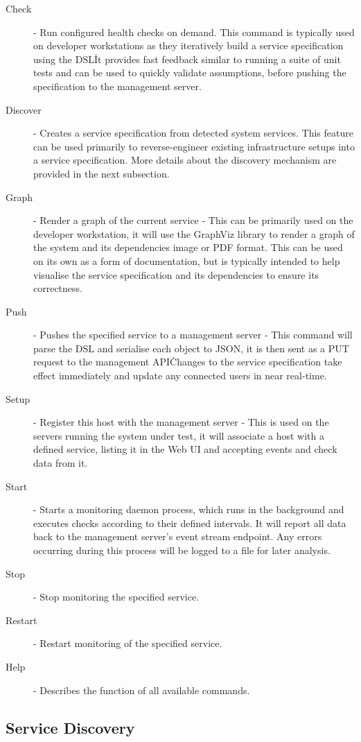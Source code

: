 \documentclass{cshonours}
\begin{document}
\begin{description}
  \item[Check] - Run configured health checks on demand. This command is typically used on developer workstations as they iteratively build a service specification using the DSL\. It provides fast feedback similar to running a suite of unit tests and can be used to quickly validate assumptions, before pushing the specification to the management server.
  \item[Discover] - Creates a service specification from detected system services. This feature can be used primarily to reverse-engineer existing infrastructure setups into a service specification. More details about the discovery mechanism are provided in the next subsection.
  \item[Graph] - Render a graph of the current service - This can be primarily used on the developer workstation, it will use the GraphViz library to render a graph of the system and its dependencies image or PDF format. This can be used on its own as a form of documentation, but is typically intended to help visualise the service specification and its dependencies to ensure its correctness.
  \item[Push] - Pushes the specified service to a management server - This command will parse the DSL and serialise each object to JSON, it is then sent as a PUT request to the management API\. Changes to the service specification take effect immediately and update any connected users in near real-time.
  \item[Setup] - Register this host with the management server - This is used on the servers running the system under test, it will associate a host with a defined service, listing it in the Web UI and accepting events and check data from it.
  \item[Start] - Starts a monitoring daemon process, which runs in the background and executes checks according to their defined intervals. It will report all data back to the management server's event stream endpoint. Any errors occurring during this process will be logged to a file for later analysis.
  \item[Stop] - Stop monitoring the specified service.
  \item[Restart] - Restart monitoring of the specified service.
  \item[Help] - Describes the function of all available commands.
\end{description}

\subsection{Service Discovery}
\end{document}
